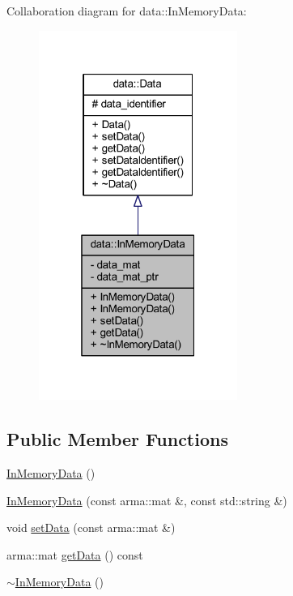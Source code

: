 Collaboration diagram for data\+:\+:In\+Memory\+Data\+:\nopagebreak
\begin{figure}[H]
\begin{center}
\leavevmode
\includegraphics[width=184pt]{classdata_1_1_in_memory_data__coll__graph}
\end{center}
\end{figure}
\subsection*{Public Member Functions}
\begin{DoxyCompactItemize}
\item 
\mbox{\hyperlink{classdata_1_1_in_memory_data_a85adf030d1a4a1f31f6d852c41750268}{In\+Memory\+Data}} ()
\item 
\mbox{\hyperlink{classdata_1_1_in_memory_data_af9bc156072099d40e45142e4c19f698c}{In\+Memory\+Data}} (const arma\+::mat \&, const std\+::string \&)
\item 
void \mbox{\hyperlink{classdata_1_1_in_memory_data_a0456d66f7930809211c75bcdd80a7bca}{set\+Data}} (const arma\+::mat \&)
\item 
arma\+::mat \mbox{\hyperlink{classdata_1_1_in_memory_data_ac0993c38a9633fa0f1ff787660b86c71}{get\+Data}} () const
\item 
\mbox{\hyperlink{classdata_1_1_in_memory_data_a675c78a5c7537ca16b8ce86b3ea1f7b3}{$\sim$\+In\+Memory\+Data}} ()
\end{DoxyCompactItemize}
